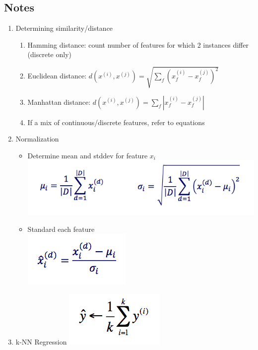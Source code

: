 \documentclass[a4paper]{article}
\begin{document}
\subsection{Notes}

\begin{enumerate}
\item Determining similarity/distance
  \begin{enumerate}
    \item Hamming distance: count number of features for which 2
      instances differ (discrete only)
      \item Euclidean distance: $d(x^{(i)},x^{(j)}) =
        \sqrt{\sum_{f}{(x_{f}^{(i)} - x_{f}^{(j)})}^{2}}$
      \item Manhattan distance: $d(x^{(i)},x^{(j)}) =
        \sum_{f}|x_{f}^{(i)} - x_{f}^{(j)}|$
      \item If a mix of continuous/discrete features, refer to equations
      \end{enumerate}
      
\item Normalization
  \begin{itemize}
  \item Determine mean and stddev for feature $x_{i}$ \\
    \includegraphics{meanstd}
  \item Standard each feature \\
    \includegraphics{stand}
  \end{itemize}
  
\item k-NN Regression
  \includegraphics{knnreg}


\end{enumerate}
\end{document}
